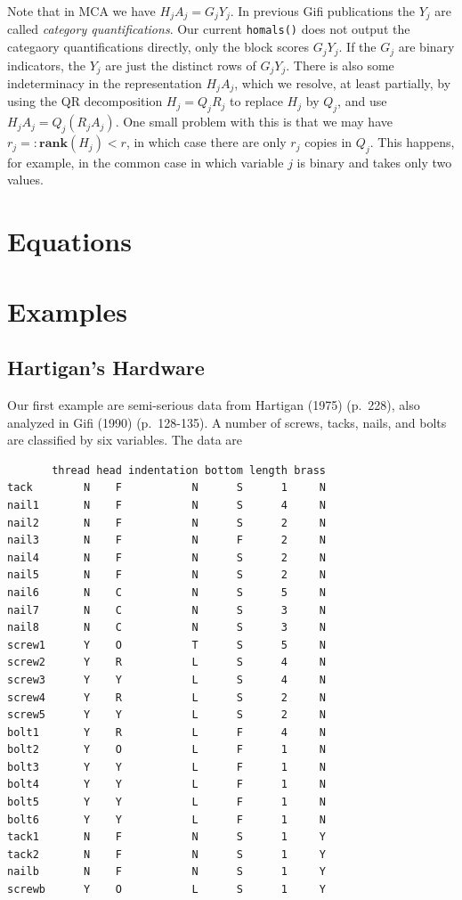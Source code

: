 \documentclass[
  12pt,
  letterpaper,
  DIV=11,
  numbers=noendperiod]{scrreprt}
\newcommand{\df}{=:}
\begin{document}
Note that in MCA we have \(H_jA_j=G_jY_j\). In previous Gifi
publications the \(Y_j\) are called \emph{category quantifications}. Our
current \texttt{homals()} does not output the categaory quantifications
directly, only the block scores \(G_jY_j\). If the \(G_j\) are binary
indicators, the \(Y_j\) are just the distinct rows of \(G_jY_j\). There
is also some indeterminacy in the representation \(H_jA_j\), which we
resolve, at least partially, by using the QR decomposition
\(H_j=Q_jR_j\) to replace \(H_j\) by \(Q_j\), and use
\(H_jA_j=Q_j(R_jA_j)\). One small problem with this is that we may have
\(r_j\df\mathbf{rank}(H_j)<r\), in which case there are only \(r_j\)
copies in \(Q_j\). This happens, for example, in the common case in
which variable \(j\) is binary and takes only two values.

\section{Equations}\label{equations}

\section{Examples}\label{examples}

\subsection{Hartigan's Hardware}\label{hartigans-hardware}

Our first example are semi-serious data from Hartigan (1975) (p.~228),
also analyzed in Gifi (1990) (p.~128-135). A number of screws, tacks,
nails, and bolts are classified by six variables. The data are

\begin{verbatim}
       thread head indentation bottom length brass
tack        N    F           N      S      1     N
nail1       N    F           N      S      4     N
nail2       N    F           N      S      2     N
nail3       N    F           N      F      2     N
nail4       N    F           N      S      2     N
nail5       N    F           N      S      2     N
nail6       N    C           N      S      5     N
nail7       N    C           N      S      3     N
nail8       N    C           N      S      3     N
screw1      Y    O           T      S      5     N
screw2      Y    R           L      S      4     N
screw3      Y    Y           L      S      4     N
screw4      Y    R           L      S      2     N
screw5      Y    Y           L      S      2     N
bolt1       Y    R           L      F      4     N
bolt2       Y    O           L      F      1     N
bolt3       Y    Y           L      F      1     N
bolt4       Y    Y           L      F      1     N
bolt5       Y    Y           L      F      1     N
bolt6       Y    Y           L      F      1     N
tack1       N    F           N      S      1     Y
tack2       N    F           N      S      1     Y
nailb       N    F           N      S      1     Y
screwb      Y    O           L      S      1     Y
\end{verbatim}
\end{document}

